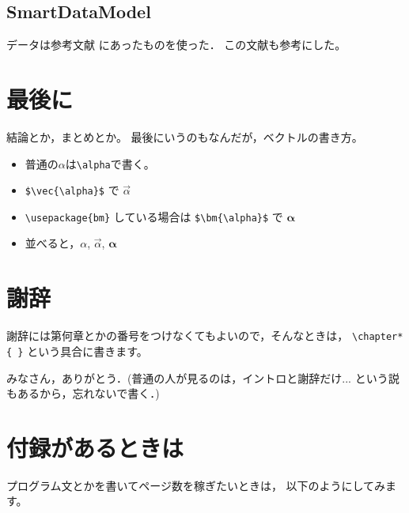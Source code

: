 \documentclass[a4paper, 12pt]{jsreport}
\begin{document}
  \section{SmartDataModel}


  データは参考文献\cite{rika} にあったものを使った． この文献\cite{ten}も参考にした。


  \chapter{最後に}


  結論とか，まとめとか。 最後にいうのもなんだが，ベクトルの書き方。
  \begin{itemize}
    \item 普通の$\alpha$は\verb|\alpha|で書く。

    \item \verb|$\vec{\alpha}$| で $\vec{\alpha}$

    \item \verb|\usepackage{bm}| している場合は \verb|$\bm{\alpha}$| で $\bm{\alpha}$

    \item 並べると，$\alpha$, $\vec{\alpha}$, $\bm{\alpha}$
  \end{itemize}

  \chapter*{謝辞}


  謝辞には第何章とかの番号をつけなくてもよいので，そんなときは， \verb|\chapter*{ }|
  という具合に書きます。

  みなさん，ありがとう．(普通の人が見るのは，イントロと謝辞だけ... という説もあるから，忘れないで書く．)

  \appendix
  \chapter{付録があるときは}
  プログラム文とかを書いてページ数を稼ぎたいときは， 以下のようにしてみます。
\end{document}
